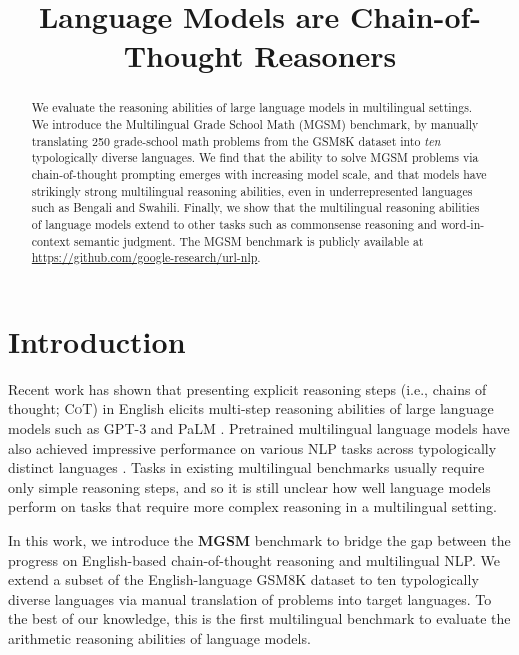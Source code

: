 \title{Language Models are Chain-of-Thought Reasoners}

\begin{abstract}
We evaluate the reasoning abilities of large language models in multilingual settings. We introduce the Multilingual Grade School Math ({MGSM}) benchmark, by manually translating 250 grade-school math problems from the GSM8K dataset \citep{cobbe2021training} into \textit{ten} typologically diverse languages. We find that the ability to solve {MGSM} problems via chain-of-thought prompting emerges with increasing model scale, and that models have strikingly strong multilingual reasoning abilities, even in underrepresented languages such as Bengali and Swahili. Finally, we show that the multilingual reasoning abilities of language models extend to other tasks such as commonsense reasoning and word-in-context semantic judgment. The MGSM benchmark is publicly available at \url{https://github.com/google-research/url-nlp}.
\end{abstract}

\section{Introduction}

Recent work has shown that presenting explicit reasoning steps (i.e., chains of thought; \textsc{CoT}) in English elicits multi-step reasoning abilities of large language models such as GPT-3 and PaLM \citep[\textit{inter alia}]{brown2020language,chowdhery2022palm,wei2022chain}. Pretrained multilingual language models have also achieved impressive performance on various NLP tasks across typologically distinct languages \citep[\textit{inter alia}]{conneau-etal-2020-unsupervised,xue-etal-2021-mt5,chowdhery2022palm,clark-etal-2020-tydi,hu2020xtreme,ruder-etal-2021-xtreme}. Tasks in existing multilingual benchmarks usually require only simple reasoning steps, and so it is still unclear how well language models perform on tasks that require more complex reasoning in a multilingual setting. 

In this work, we introduce the \textbf{MGSM} benchmark to bridge the gap between the progress on English-based chain-of-thought reasoning and multilingual NLP. We extend a subset of the English-language GSM8K dataset \citep{cobbe2021training} to ten typologically diverse languages via manual translation of problems into target languages. To the best of our knowledge, this is the first multilingual benchmark to evaluate the arithmetic reasoning abilities of language models.

